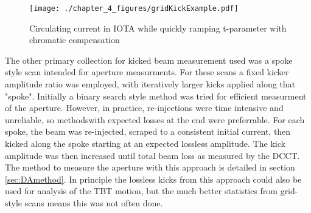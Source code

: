\begin{figure}
	\centering
	\texttt{[image: ./chapter\_4\_figures/gridKickExample.pdf]}
	\caption{Circulating current in IOTA while quickly ramping t-parameter with chromatic compensation}
	\label{fig:gridKick}
\end{figure}

The other primary collection for kicked beam measurement used was a spoke style scan intended for aperture measurments. For these scans a fixed kicker amplitude ratio was employed, with iteratively larger kicks applied along that "spoke". Initially a binary search style method was tried for efficient measurment of the aperture. However, in practice, re-injections were time intensive and unreliable, so methodswith expected losses at the end were preferrable. For each spoke, the beam was re-injected, scraped to a consistent initial current, then kicked along the spoke starting at an expected lossless amplitude. The kick amplitude was then increased until total beam loss as measured by the DCCT. The method to measure the aperture with this approach is detailed in section \ref{sec:DAmethod}. In principle the lossless kicks from this approach could also be used for analysis of the TBT motion, but the much better statistics from grid-style scans means this was not often done.

